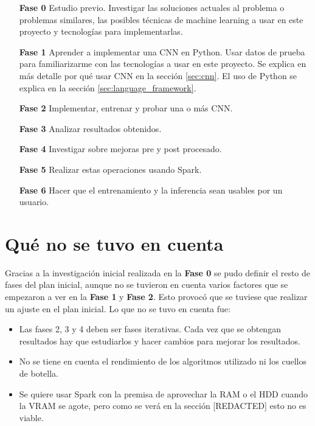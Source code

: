 \begin{itemize}
\item[\textbf{Fase 0}] Estudio previo. Investigar las soluciones actuales al problema o problemas similares, las posibles técnicas de machine learning a usar en este proyecto y tecnologías para implementarlas.
\item[\textbf{Fase 1}] Aprender a implementar una CNN en Python. Usar datos de prueba para familiarizarme con las tecnologías a usar en este proyecto. Se explica en más detalle por qué usar CNN en la sección \ref{sec:cnn}. El uso de Python se explica en la sección \ref{sec:language_framework}.
\item[\textbf{Fase 2}] Implementar, entrenar y probar una o más CNN.
\item[\textbf{Fase 3}] Analizar resultados obtenidos.
\item[\textbf{Fase 4}] Investigar sobre mejoras pre y post procesado.
\item[\textbf{Fase 5}] Realizar estas operaciones usando Spark.
\item[\textbf{Fase 6}] Hacer que el entrenamiento y la inferencia sean usables por un usuario.
\end{itemize}

\section{Qué no se tuvo en cuenta}\label{sec:nosetuvoencuenta}

Gracias a la investigación inicial realizada en la \textbf{Fase 0} se pudo definir el resto de fases del plan inicial, aunque no se tuvieron en cuenta varios factores que se empezaron a ver en la \textbf{Fase 1} y \textbf{Fase 2}. Esto provocó que se tuviese que realizar un ajuste en el plan inicial. 
Lo que no se tuvo en cuenta fue:

\begin{itemize}
\item Las fases 2, 3 y 4 deben ser fases iterativas. Cada vez que se obtengan resultados hay que estudiarlos y hacer cambios para mejorar los resultados.
\item No se tiene en cuenta el rendimiento de los algoritmos utilizado ni los cuellos de botella.
\item Se quiere usar Spark con la premisa de aprovechar la RAM o el HDD cuando la VRAM se agote, pero como se verá en la sección [REDACTED] esto no es viable.
\end{itemize}

